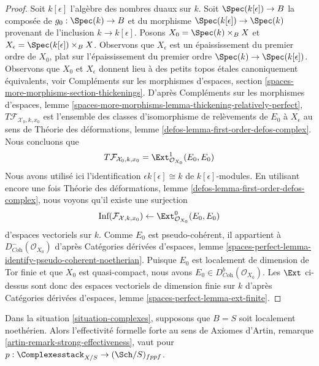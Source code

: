 \begin{proof}
\medskip\noindent
Soit $k[\epsilon]$ l'algèbre des nombres duaux sur $k$.
Soit $\Spec(k[\epsilon]) \to B$ la composée de $g_0 : \Spec(k) \to B$ et du
morphisme $\Spec(k[\epsilon]) \to \Spec(k)$ provenant de l'inclusion
$k \to k[\epsilon]$.
Posons $X_0 = \Spec(k) \times_B X$ et
$X_\epsilon = \Spec(k[\epsilon]) \times_B X$.
Observons que $X_\epsilon$ est un épaississement du premier ordre de $X_0$,
plat sur l'épaississement du premier ordre
$\Spec(k) \to \Spec(k[\epsilon])$.
Observons que $X_0$ et $X_\epsilon$ donnent lieu à des petits topos \'etales
canoniquement équivalents, voir
Compléments sur les morphismes d'espaces, section
\ref{spaces-more-morphisms-section-thickenings}.
D'après Compléments sur les morphismes d'espaces, lemme
\ref{spaces-more-morphisms-lemma-thickening-relatively-perfect},
$T\mathcal{F}_{\mathcal{X}_0, k, x_0}$ est l'ensemble des classes
d'isomorphisme de relèvements de $E_0$ à $X_\epsilon$ au sens de
Théorie des déformations, lemme
\ref{defos-lemma-first-order-defos-complex}.
Nous concluons que
$$
T\mathcal{F}_{\mathcal{X}_0, k, x_0} =
\Ext^1_{\mathcal{O}_{X_0}}(E_0, E_0)
$$
Nous avons utilisé ici l'identification $\epsilon k[\epsilon] \cong k$ de
$k[\epsilon]$-modules. En utilisant encore une fois
Théorie des déformations, lemme
\ref{defos-lemma-first-order-defos-complex}, nous voyons qu'il existe une
surjection
$$
\text{Inf}(\mathcal{F}_{\mathcal{X}, k, x_0})
\leftarrow
\Ext^0_{\mathcal{O}_{X_0}}(E_0, E_0)
$$
d'espaces vectoriels sur $k$. Comme $E_0$ est pseudo-cohérent, il appartient à
$D^-_{\textit{Coh}}(\mathcal{O}_{X_0})$ d'après
Catégories dérivées d'espaces, lemme
\ref{spaces-perfect-lemma-identify-pseudo-coherent-noetherian}.
Puisque $E_0$ est localement de dimension de Tor finie et que $X_0$ est
quasi-compact, nous avons
$E_0 \in D^b_{\textit{Coh}}(\mathcal{O}_{X_0})$.
Les $\Ext$ ci-dessus sont donc des espaces vectoriels de dimension finie sur
$k$ d'après Catégories dérivées d'espaces, lemme
\ref{spaces-perfect-lemma-ext-finite}.
\end{proof}

\begin{lemma}
\label{lemma-complexes-strong-effectiveness}
Dans la situation \ref{situation-complexes}, supposons que $B = S$ soit
localement noethérien. Alors l'effectivité formelle forte au sens de
Axiomes d'Artin, remarque \ref{artin-remark-strong-effectiveness},
vaut pour $p : \Complexesstack_{X/S} \to (\Sch/S)_{fppf}$.
\end{lemma}

